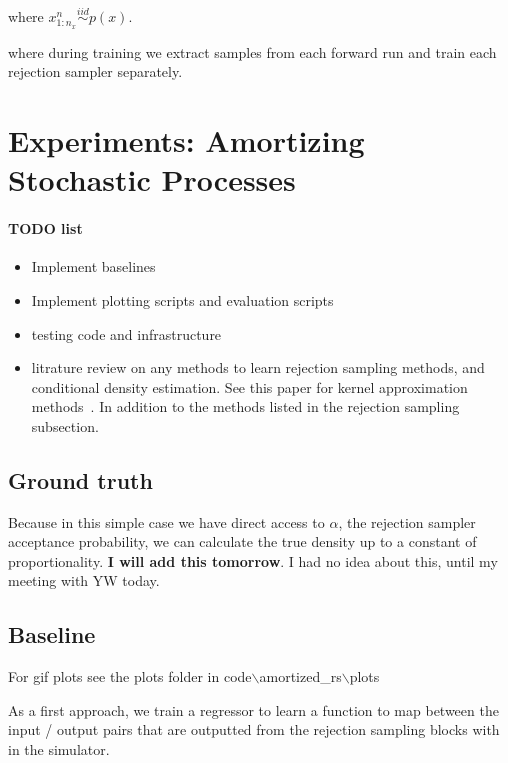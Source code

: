 \documentclass{article}
\begin{document}
where $x^{n}_{1:n_x} \stackrel{iid}\sim p(x)$. 

where during training we extract samples from each forward run and train each rejection sampler
separately. 


\section{Experiments: Amortizing Stochastic Processes}
\label{sec:experiments}
\paragraph{TODO list}
\begin{itemize}
  \item Implement baselines
  \item Implement plotting scripts and evaluation scripts
  \item testing code and infrastructure
  \item litrature review on any methods to learn rejection sampling methods, 
  and conditional density estimation. See this paper for kernel approximation 
  methods~\cite{erraqabi2016pliable}. In addition to the methods listed in the 
  rejection sampling subsection. 
\end{itemize}


\subsection{Ground truth}

Because in this simple case we have direct access to $\alpha$, the rejection sampler acceptance probability,
we can calculate the true density up to a constant of proportionality. 
\textbf{I will add this tomorrow}. I had no idea about this, until my meeting with 
YW today. 

\subsection{Baseline}
For gif plots see the plots folder in code$\backslash$amortized\_rs$\backslash$plots 


As a first approach, we train a regressor to learn a function to map
between the input / output pairs that are outputted from the rejection
sampling blocks with in the simulator. 
\end{document}
